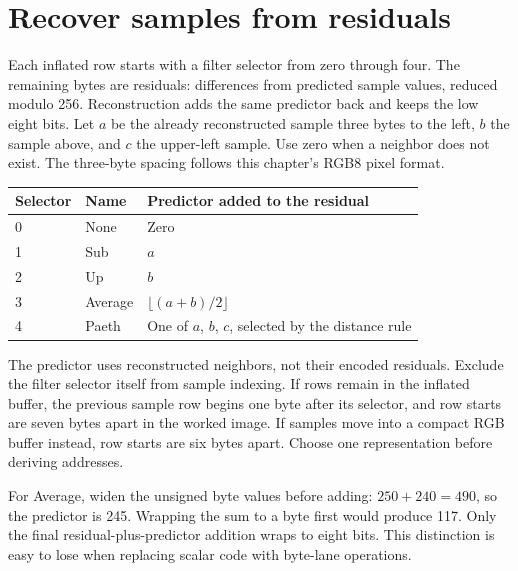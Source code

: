 \section{Recover samples from residuals}
Each inflated row starts with a filter selector from zero through four. The remaining
bytes are residuals: differences from predicted sample values, reduced modulo 256.
Reconstruction adds the same predictor back and keeps the low eight bits. Let $a$ be
the already reconstructed sample three bytes to the left, $b$ the sample above, and
$c$ the upper-left sample. Use zero when a neighbor does not exist. The three-byte
spacing follows this chapter's RGB8 pixel format.

\begin{longtable}{p{18mm}p{28mm}p{104mm}}
\toprule Selector & Name & Predictor added to the residual \\\midrule
0 & None & Zero \\
1 & Sub & $a$ \\
2 & Up & $b$ \\
3 & Average & $\lfloor(a+b)/2\rfloor$ \\
4 & Paeth & One of $a$, $b$, $c$, selected by the distance rule \\\bottomrule
\end{longtable}
The predictor uses reconstructed neighbors, not their encoded residuals. Exclude the
filter selector itself from sample indexing. If rows remain in the inflated buffer,
the previous sample row begins one byte after its selector, and row starts are seven
bytes apart in the worked image. If samples move into a compact RGB buffer instead,
row starts are six bytes apart. Choose one representation before deriving addresses.

For Average, widen the unsigned byte values before adding: $250+240=490$, so the
predictor is 245. Wrapping the sum to a byte first would produce 117. Only the final
residual-plus-predictor addition wraps to eight bits. This distinction is easy to lose
when replacing scalar code with byte-lane operations.
